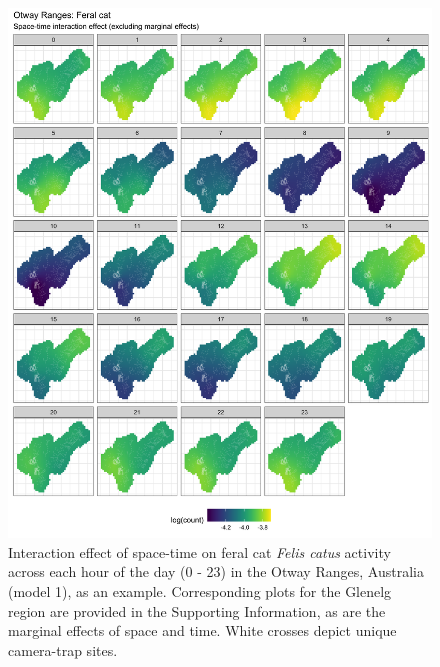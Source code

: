 \documentclass[11pt,a4paper,titlepage,twoside,openright]{style/unimelbthesis}
\begin{document}
\begin{mainmatter}
\begin{figure}
{\centering \includegraphics[width=1\linewidth]{figure/spte_diff_avg_o_cat} 

}

\caption{Interaction effect of space-time on feral cat \textit{Felis catus} activity across each hour of the day (0 - 23) in the Otway Ranges, Australia (model 1), as an example. Corresponding plots for the Glenelg region are provided in the Supporting Information, as are the marginal effects of space and time. White crosses depict unique camera-trap sites.}\label{fig:diel-st-int-o-cat}
\end{figure}
\begin{figure}


\end{figure}
\end{mainmatter}
\end{document}
